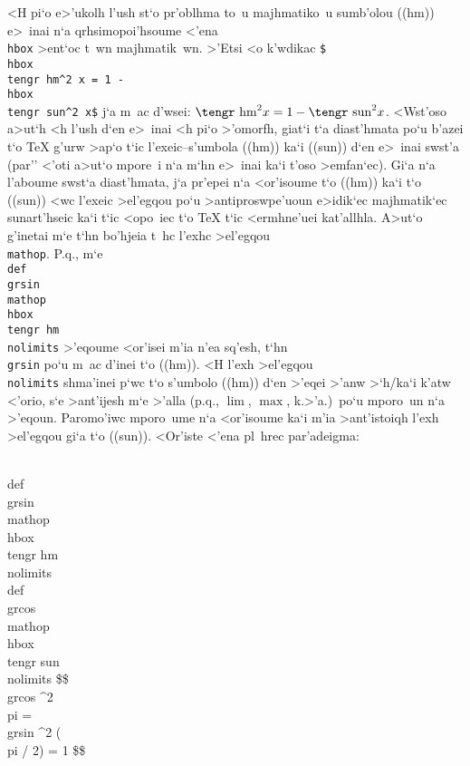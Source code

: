 <H pi`o e>'ukolh l'ush st`o pr'oblhma to~u majhmatiko~u sumb'olou ((hm))
e>~inai n`a qrhsimopoi'hsoume <'ena {\tt\\hbox} >ent`oc t~wn
majhmatik~wn.  >'Etsi <o k'wdikac {\tt\$\\hbox\lb\\tengr hm\rb \^{}2 x =
1 - \\hbox\lb\\tengr sun\rb \^{}2 x\$} j`a m~ac d'wsei: $\hbox{\tengr
hm}^2 x = 1 - \hbox{\tengr sun}^2 x$\null. <Wst'oso a>ut`h <h l'u\-sh
d`en e>~inai <h pi`o >'omorfh, giat`i t`a diast'hmata po`u b'azei t`o
{\rm \TeX} g'urw >ap`o t`ic l'exeic--s'umbola ((hm)) ka`i ((sun)) d`en
e>~inai swst'a (par'' <'oti a>ut`o mpore~i n`a m`hn e>~inai ka`i t'oso
>emfan`ec). Gi`a n`a l'aboume swst`a diast'hmata, j`a pr'epei n`a
<or'isoume t`o ((hm)) ka`i t`o ((sun)) <wc l'exeic >el'egqou po`u
>antiproswpe'uoun e>idik`ec majhmatik`ec sunart'hseic ka`i t`ic <opo~iec
t`o {\rm \TeX} t`ic <ermhne'uei kat'allhla.  A>ut`o g'inetai m`e t`hn
bo'hjeia t~hc l'exhc >el'egqou {\tt\\mathop}. P.q., m`e
{\tt\\def\\grsin\lb\\mathop\lb\\hbox\lb\\tengr hm\rb\rb\\nolimits\rb}
>'eqoume <or'isei m'ia n'ea sq'esh, t`hn {\tt\\grsin} po`u m~ac d'inei
t`o ((hm)).  <H l'exh >el'egqou {\tt\\nolimits} shma'inei p`wc t`o
s'umbolo ((hm)) d`en >'eqei >'anw >`h/ka`i k'atw <'orio, s`e >ant'ijesh
m`e >'alla (p.q., $\lim$, $\max$, k.>'a.)\ po`u mporo~un n`a
>'eqoun. Paromo'iwc mporo~ume n`a <or'isoume ka`i m'ia
>ant'istoiqh l'exh >el'egqou gi`a t`o ((sun)). <Or'iste <'ena pl~hrec
par'adeigma:

\beginuser
\\def\\grsin\lb\\mathop\lb\\hbox\lb\\tengr hm\rb\rb\\nolimits\rb
\\def\\grcos\lb\\mathop\lb\\hbox\lb\\tengr sun\rb\rb\\nolimits\rb
\$\$ \\grcos \^{}2 \\pi = \\grsin \^{}2 (\\pi / 2) = 1 \$\$
\enduser

